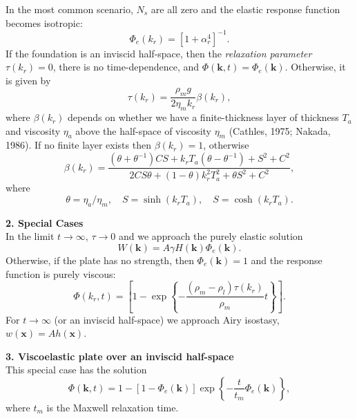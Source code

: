 \documentclass[12pt]{article}
\begin{document}
In the most common scenario, $N_s$ are all zero and the elastic response function becomes isotropic:
\begin{equation}
\Phi_e(k_r) = \left [ 1 + \alpha_r^4 \right ]^{-1}.
\label{eq:Eq_9}
\end{equation}
If the foundation is an inviscid half-space, then the {\it relaxation parameter} $\tau(k_r) = 0$, there is no time-dependence,
and $\Phi(\mathbf{k},t) = \Phi_e(\mathbf{k})$. Otherwise, it is given by
\begin{equation}
\tau(k_r) = \frac{\rho_m g}{2 \eta_m k_r} \beta(k_r),
\label{eq:Eq_10}
\end{equation}
where $\beta(k_r)$ depends on whether we have a finite-thickness layer of thickness $T_a$ and viscosity
$\eta_a$ above the half-space of viscosity $\eta_m$ (Cathles, 1975; Nakada, 1986).
If no finite layer exists then $\beta(k_r) = 1$, otherwise
\begin{equation}
\beta(k_r) = \frac{(\theta + \theta^{-1}) CS + k_r T_a (\theta - \theta^{-1}) + S^2 + C^2}{2CS\theta + (1-\theta)k_r^2 T_a^2 + \theta S^2 + C^2},
\label{eq:Eq_11}
\end{equation}
where
\begin{equation}
\theta = \eta_a/\eta_m, \quad S = \sinh (k_r T_a), \quad S = \cosh (k_r T_a).
\label{eq:Eq_12}
\end{equation}

{\center \bf 2. Special Cases}\\

\noindent
In the limit $t \rightarrow \infty$, $\tau  \rightarrow0$ and we approach the purely elastic solution
\begin{equation}
W(\mathbf{k}) = A \gamma H(\mathbf{k}) \Phi_e(\mathbf{k}).
\label{eq:Eq21}
\end{equation}
Otherwise, if the plate has no strength, then $\Phi_e(\mathbf{k}) = 1$ and the response function is {purely viscous}:
\begin{equation}
\Phi(k_r,t) = \left [ 1 - \exp \left \{ - \frac{(\rho_m - \rho_l) \tau(k_r)}{\rho_m} t \right \} \right ].
\label{eq:Eq19b}
\end{equation}
For $t \rightarrow \infty$ (or an inviscid half-space) we approach Airy isostasy, $w(\mathbf{x}) = A h(\mathbf{x})$.

{\center \bf 3. Viscoelastic plate over an inviscid half-space}\\

This special case has the solution
\begin{equation}
\Phi(\mathbf{k},t) = 1 - \left [ 1 - \Phi_e(\mathbf{k}) \right ] \exp \left \{ - \frac{t }{t_m}\Phi_e(\mathbf{k}) \right \},
\end{equation}
where $t_m$ is the Maxwell relaxation time.
\end{document}
